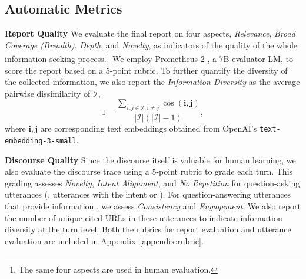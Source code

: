 \documentclass[11pt]{article}
\begin{document}
\subsection{Automatic Metrics}
\label{sec:eval_metrics}
\noindent
\textbf{Report Quality}\quad
We evaluate the final report on four aspects, \textit{Relevance}, \textit{Broad Coverage (Breadth)}, \textit{Depth}, and \textit{Novelty}, as indicators of the quality of the whole information-seeking process.\footnote{The same four aspects are used in human evaluation.} We employ Prometheus 2 \citep{kim2024prometheus}, a 7B evaluator LM, to score the report based on a 5-point rubric. To further quantify the diversity of the collected information, we also report the \textit{Information Diversity} as the average pairwise dissimilarity of $\mathcal{I}$,
\begin{equation}\nonumber
    1-\frac{\sum_{i,j\in\mathcal{I},i\neq j}\operatorname{cos}(\mathbf{i}, \mathbf{j})}{|\mathcal{I}|(|\mathcal{I}|-1)},
\end{equation}
where $\mathbf{i},\mathbf{j}$ are corresponding text embeddings obtained from OpenAI's \texttt{text-embedding-3-small}.%



\noindent
\textbf{Discourse Quality}\quad
Since the discourse itself is valuable for human learning, we also evaluate the discourse trace using a 5-point rubric to grade each turn. This grading assesses \textit{Novelty}, \textit{Intent Alignment}, and \textit{No Repetition} for question-asking utterances (\ie, utterances with the intent  or ). For question-answering utterances that provide information%
, we assess \textit{Consistency} and \textit{Engagement}. We also report the number of unique cited URLs in these utterances to indicate information diversity at the turn level. %
Both the rubrics for report evaluation and utterance evaluation are included in Appendix~\ref{appendix:rubric}.
\end{document}
